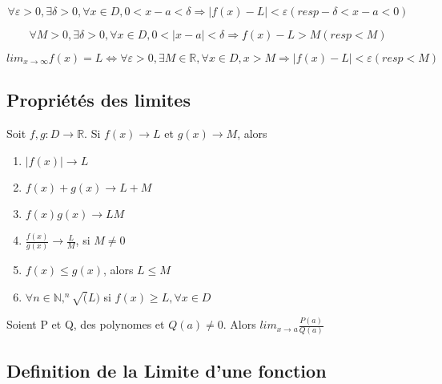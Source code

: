 \documentclass{article}
\begin{document}
\begin{definition}
    $$ \forall \varepsilon > 0, \exists \delta > 0, \forall x \in D,
    0 < x-a < \delta \Longrightarrow |f(x)-L|< \varepsilon (resp
    -\delta < x-a <0)$$
\end{definition}

\begin{definition}
    $$ \forall M > 0, \exists \delta > 0, \forall x \in D,
    0 < |x-a| < \delta \Longrightarrow f(x)-L > M (resp <M)$$
\end{definition}

\begin{definition}
    $$ lim_{x \to \infty} f(x)=L \Longleftrightarrow \forall \varepsilon >0,
    \exists M \in \mathbb{R}, \forall x \in D, x >M \Longrightarrow
    |f(x) -L|< \varepsilon (resp <M)$$
\end{definition}

\subsection{Propriétés des limites}

\begin{theorem}
    Soit $f,g:D \to \mathbb{R}$. Si $f(x) \to L$ et $g(x) \to M$, alors
    \begin{enumerate}
	\item $ |f(x)| \to L$
	\item $ f(x) + g(x) \to L+M$
	\item $ f(x) g(x) \to LM$
	\item $ \frac{f(x)}{g(x)} \to \frac{L}{M}$, si $M \neq 0$
	\item $ f(x) \leq g(x)$, alors $L \leq M$
	\item $ \forall n \in \mathbb{N}, ^n\sqrt(L)$ si $f(x) \geq
	    L, \forall x \in D$
    \end{enumerate}
\end{theorem}

\begin{corollary}
    Soient P et Q, des polynomes et $Q(a) \neq 0$. Alors
    $ lim_{x \to a} \frac{P(a)}{Q(a)}$
\end{corollary}

\subsection{Definition de la Limite d'une fonction}
\end{document}
